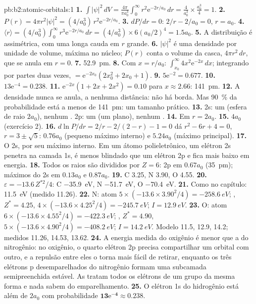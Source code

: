 \begin{solution}{pb:b2:atomic-orbitals:1}
\textbf{1.} $\int|\psi|^2\,dV = \frac{4\pi}{\pi a_0^3}\int_0^\infty r^2\mathrm e^{-2r/a_0}\,dr =
\frac{4}{a_0^3} \times \frac{a_0^3}{4} = 1$.
\textbf{2.} $P(r) = 4\pi r^2|\psi|^2 = (4/a_0^3)\,r^2\mathrm e^{-2r/a_0}$.
\textbf{3.} $dP/dr = 0$: $2/r - 2/a_0 = 0$, $r = a_0$.
\textbf{4.} $\langle r\rangle = (4/a_0^3)\int_0^\infty r^3\mathrm e^{-2r/a_0}\,dr = (4/a_0^3)
\times 6(a_0/2)^4 = 1.5a_0$.
\textbf{5.} A distribuição é assimétrica, com uma longa cauda em $r$ grande.
\textbf{6.} $|\psi|^2$ é uma densidade por unidade de volume, máxima no núcleo;
$P(r)$ conta o volume da casca, $4\pi r^2\,dr$, que se anula em $r = 0$.
\textbf{7.} \qty{52.9}{pm}.
\textbf{8.} Com $x = r/a_0$: $\int_{x_0}^\infty 4x^2\mathrm e^{-2x}\,dx$; integrando por
partes duas vezes, $= \mathrm e^{-2x_0}(2x_0^2 + 2x_0 + 1)$.
\textbf{9.} $5\mathrm e^{-2} = 0.677$.
\textbf{10.} $13\mathrm e^{-4} = 0.238$.
\textbf{11.} $\mathrm e^{-2x}(1 + 2x + 2x^2) = 0.10$ para $x \approx 2.66$: \qty{141}{pm}.
\textbf{12.} A densidade nunca se anula, a nenhuma distância: não há borda. Mas
90~\% da probabilidade está a menos de \qty{141}{pm}: um tamanho prático.
\textbf{13.} 2s: um  (esfera de raio $2a_0$), nenhum . 2p: um
 (um plano), nenhum .
\textbf{14.} Em $r = 2a_0$.
\textbf{15.} $4a_0$ (exercício 2).
\textbf{16.} $d\ln P/dr = 2/r - 2/(2 - r) - 1 = 0$ dá $r^2 - 6r + 4 = 0$, $r = 3 \pm \sqrt5$:
$0.76a_0$ (pequeno máximo interno) e $5.24a_0$ (máximo principal).
\textbf{17.} O 2s, por seu máximo interno. Em um átomo polieletrônico, um
elétron 2s penetra na camada 1s, é menos blindado que um elétron 2p e fica
mais baixo em energia.
\textbf{18.} Todos os raios são divididos por $Z = 6$: 2p em $0.67a_0$ (\qty{35}{pm});
máximos do 2s em $0.13a_0$ e $0.87a_0$.
\textbf{19.} C 3.25, N 3.90, O 4.55.
\textbf{20.} $\varepsilon = -13.6\,Z^{*2}/4$: C \qty{-35.9}{eV}, N \qty{-51.7}{eV}, O
\qty{-70.4}{eV}.
\textbf{21.} Como no capítulo: \qty{11.5}{eV} (medido 11.26).
\textbf{22.} N: atom $5 \times (-13.6 \times 3.90^2/4) = \qty{-258.6}{eV}$; , $Z^* =
4.25$, $4 \times (-13.6 \times 4.25^2/4) = \qty{-245.7}{eV}$; $I = \qty{12.9}{eV}$.
\textbf{23.} O: atom $6 \times (-13.6 \times 4.55^2/4) = \qty{-422.3}{eV}$; , $Z^* =
4.90$, $5 \times (-13.6 \times 4.90^2/4) = \qty{-408.2}{eV}$; $I = \qty{14.2}{eV}$. Modelo
11.5, 12.9, 14.2; medidos 11.26, 14.53, 13.62.
\textbf{24.} A energia medida do oxigênio é menor que a do nitrogênio: no
oxigênio, o quarto elétron 2p precisa compartilhar um orbital com outro, e a
repulsão entre eles o torna mais fácil de retirar, enquanto os três elétrons
p desemparelhados do nitrogênio formam uma subcamada semipreenchida estável. As
 tratam todos os elétrons de um grupo da mesma forma e nada
sabem do emparelhamento.
\textbf{25.} O elétron 1s do hidrogênio está além de $2a_0$ com probabilidade
$\boldsymbol{13\mathrm e^{-4} \approx 0.238}$.
\end{solution}
